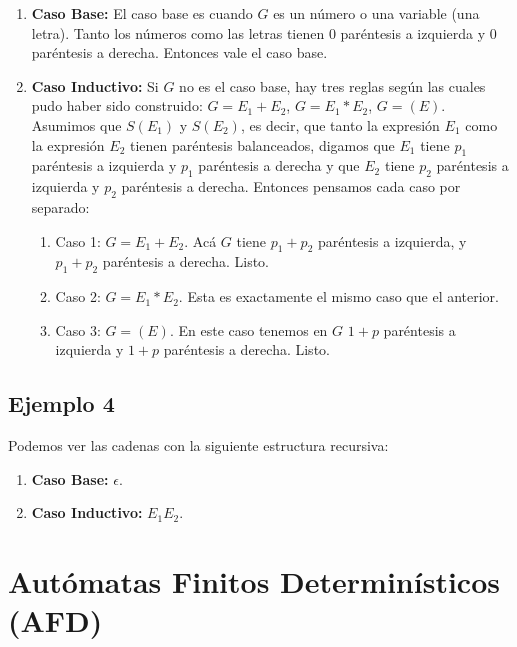 \documentclass[11pt]{article}
\begin{document}
    \begin{enumerate}
        \item \textbf{Caso Base:} El caso base es cuando $G$ es un número o una variable (una letra). Tanto los números como las letras tienen 0 paréntesis a izquierda y 0 paréntesis a derecha. Entonces vale el caso base.
        \item \textbf{Caso Inductivo:} Si $G$ no es el caso base, hay tres reglas según las cuales pudo haber sido construido: $G = E_1 + E_2$, $G = E_1 * E_2$, $G = (E)$. Asumimos que $S(E_1)$ y $S(E_2)$, es decir, que tanto la expresión $E_1$ como la expresión $E_2$ tienen paréntesis balanceados, digamos que $E_1$ tiene $p_1$ paréntesis a izquierda y $p_1$ paréntesis a derecha y que $E_2$ tiene $p_2$ paréntesis a izquierda y $p_2$ paréntesis a derecha. Entonces pensamos cada caso por separado:
        \begin{enumerate}
            \item Caso 1: $G = E_1 + E_2$. Acá $G$ tiene $p_1 + p_2$ paréntesis a izquierda, y $p_1 + p_2$ paréntesis a derecha. Listo.
            \item Caso 2: $G = E_1 * E_2$. Esta es exactamente el mismo caso que el anterior.
            \item Caso 3: $G = (E)$. En este caso tenemos en $G$ $1 + p$ paréntesis a izquierda y $1 + p$ paréntesis a derecha. Listo.
        \end{enumerate}
    \end{enumerate}

    \bigskip %

    \subsection{Ejemplo 4}

    Podemos ver las cadenas con la siguiente estructura recursiva:

    \begin{enumerate}
        \item \textbf{Caso Base:} $\epsilon$.
        \item \textbf{Caso Inductivo:} $E_1E_2$.
    \end{enumerate}

    \newpage


    \section{Autómatas Finitos Determinísticos (AFD)}
\end{document}
